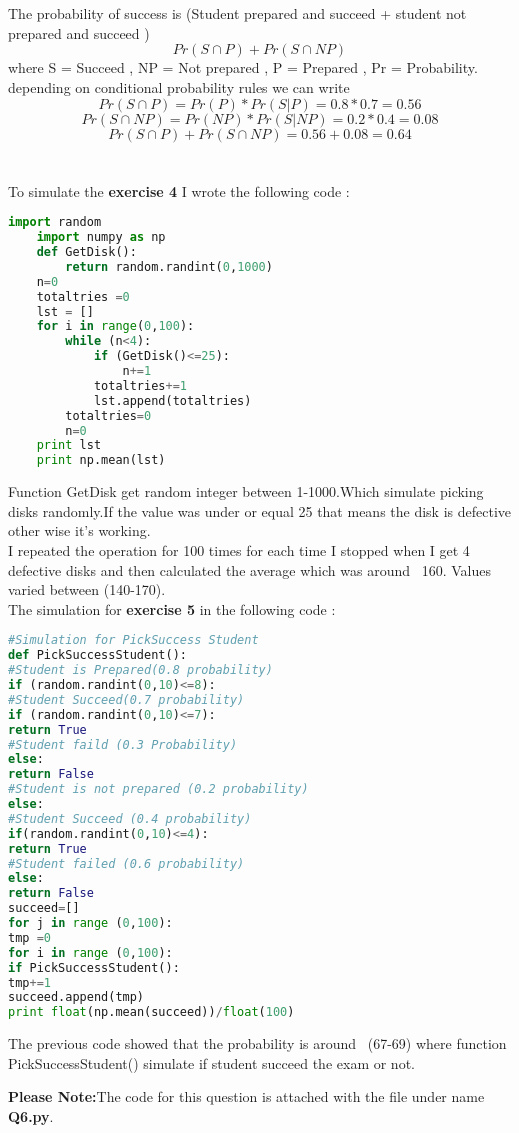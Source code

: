 \documentclass{article}
\begin{document}
	\section*{}
	The probability of success is (Student prepared and succeed + student not prepared and succeed ) \[Pr(S\cap P)+Pr(S\cap NP)\] where S = Succeed , NP = Not prepared , P = Prepared , Pr = Probability.\\
	depending on conditional probability rules we can write 
	\[Pr(S\cap P )= Pr(P) * Pr(S|P) =0.8 * 0.7 = 0.56 \]
	\[Pr(S\cap NP) = Pr(NP)* Pr(S|NP)=0.2 *0.4= 0.08\]
\[Pr(S\cap P)+Pr(S\cap NP) = 0.56+0.08 = 0.64\] 
	\section*{}
	To simulate the \textbf{exercise 4} I wrote the following code : 
	\begin{lstlisting}[language=python]
	import random
	import numpy as np
	def GetDisk():
		return random.randint(0,1000)
	n=0
	totaltries =0
	lst = []
	for i in range(0,100):
		while (n<4):
			if (GetDisk()<=25):
				n+=1
			totaltries+=1
			lst.append(totaltries)
		totaltries=0
		n=0
	print lst
	print np.mean(lst)
	\end{lstlisting}
Function GetDisk get random integer between 1-1000.Which simulate picking disks randomly.If the value was under or equal 25 that means the disk is defective other wise it's working.\\
I repeated the operation for 100 times for each time I stopped when I get 4 defective disks and then calculated the average which was around ~160. Values varied between (140-170).\\
The simulation for \textbf{exercise 5} in the following code : \\
\begin{lstlisting}[language=python]
#Simulation for PickSuccess Student
def PickSuccessStudent():
#Student is Prepared(0.8 probability)
if (random.randint(0,10)<=8):
#Student Succeed(0.7 probability)
if (random.randint(0,10)<=7):
return True
#Student faild (0.3 Probability)
else:
return False
#Student is not prepared (0.2 probability)
else:
#Student Succeed (0.4 probability)
if(random.randint(0,10)<=4):
return True
#Student failed (0.6 probability)
else:
return False
succeed=[]
for j in range (0,100):
tmp =0
for i in range (0,100):
if PickSuccessStudent():
tmp+=1
succeed.append(tmp)
print float(np.mean(succeed))/float(100)
\end{lstlisting}
The previous code showed that the probability is around ~(67-69) where function PickSuccessStudent() simulate if student succeed the exam or not.\\
\begin{flushleft}
\textbf{Please Note:}The code for this question is attached with the file under name \textbf{Q6.py}.\\
\end{flushleft}

\end{document}
